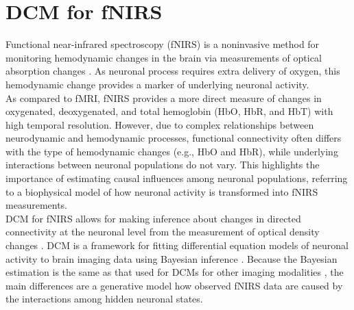 

\chapter{DCM for fNIRS \label{Chap:data:dcm_phase}}

Functional near-infrared spectroscopy (fNIRS) is a noninvasive method for monitoring hemodynamic changes in the brain via measurements of optical absorption changes \citep{jobsis1977noninvasive}. As neuronal process requires extra delivery of oxygen, this hemodynamic change provides a marker of underlying neuronal activity. \\

As compared to fMRI, fNIRS provides a more direct measure of changes in oxygenated, deoxygenated, and total hemoglobin (HbO, HbR, and HbT) with high temporal resolution. However, due to complex relationships between neurodynamic and hemodynamic processes, functional connectivity often differs with the type of hemodynamic changes (e.g., HbO and HbR), while underlying interactions between neuronal populations do not vary. This highlights the importance of estimating causal influences among neuronal populations, referring to a biophysical model of how neuronal activity is transformed into fNIRS measurements. \\

DCM for fNIRS allows for making inference about changes in directed connectivity at the neuronal level from the measurement of optical density changes \citep{tak2015dynamic}. DCM is a framework for fitting differential equation models of neuronal activity to brain imaging data using Bayesian inference \citep{Friston2003a, Friston2007a, families}. Because the Bayesian estimation is the same as that used for DCMs for other imaging modalities \citep{Friston2007a, families}, the main differences are a generative model how observed fNIRS data are caused by the interactions among hidden neuronal states. \\

